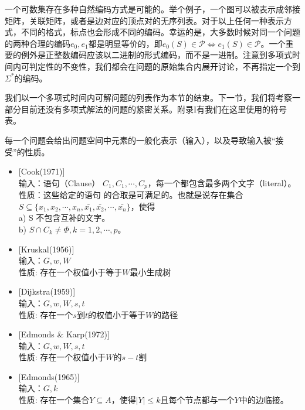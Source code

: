 \documentclass[twocolumn]{article}
\theoremstyle{nonumberplain}%
\begin{document}
\begin{CJK}{UTF8}{gbsn}
    一个可数集存在多种自然编码方式是可能的。举个例子，一个图可以被表示成邻接矩阵，关联矩阵，或者是边对应的顶点对的无序列表。对于以上任何一种表示方式，不同的格式，标点也会形成不同的编码。幸运的是，大多数时候对同一个问题的两种合理的编码$e_0,e_1$都是明显等价的，即$e_0(S)\in\mathcal{P}\Leftrightarrow e_1(S)\in\mathcal{P}$。一个重要的例外是正整数编码应该以二进制的形式编码，而不是一进制。注意到多项式时间内可判定性的不变性，我们都会在问题的原始集合内展开讨论，不再指定一个到$\Sigma^*$的编码。

    我们以一个多项式时间内可解问题的列表作为本节的结束。下一节，我们将考察一部分目前还没有多项式解法的问题的紧密关系。附录I有我们在这里使用的符号表。

    每一个问题会给出问题空间中元素的一般化表示（输入），以及导致输入被“接受”的性质。

    \begin{itemize}
    \item {}[Cook(1971)]\\
    输入：语句（Clause） $C_1,C_1,\cdots,C_p$，每一个都包含最多两个文字（literal）。\\
    性质：这些给定的语句 的合取是可满足的。也就是说存在集合$S\subseteq\{x_1,x_2,\cdots,x_n,\bar{x_1},\bar{x_2},\cdots,\bar{x_n}\}$，使得 \\
    \indent a) S 不包含互补的文字。\\
    \indent b) $S\cap C_k \neq \Phi, k = 1,2,\cdots,p$。

    \item {}[Kruskal(1956)]\\
    输入：$G, w, W$\\
    性质: 存在一个权值小于等于$W$最小生成树

    \item {}[Dijkstra(1959)]\\
    输入：$G, w, W, s, t$\\
    性质: 存在一个$s$到$t$的权值小于等于$W$的路径

    \item {}[Edmonds \& Karp(1972)]\\
    输入：$G, w, W, s, t$\\
    性质: 存在一个权值小于$W$的$s-t$割

    \item {}[Edmonds(1965)]\\
    输入：$G, k$\\
    性质: 存在一个集合$Y\subseteq A$，使得$|Y|\le k$且每个节点都与一个$Y$中的边临接。


\end{itemize}
\end{CJK}
\end{document}
